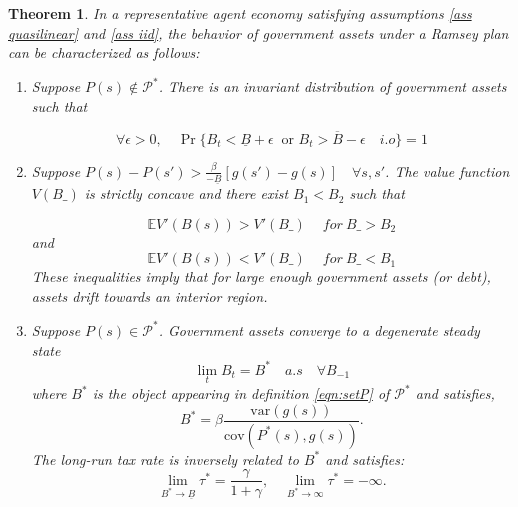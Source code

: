 \documentclass[thmsb,11pt]{article}
\newtheorem{theorem}{Theorem}
\newcommand{\var}{\mathrm{var}}
\newcommand{\cov}{\mathrm{cov}}
\begin{document}




\begin{theorem}
\label{thm: rep agent general theorem}
In a representative agent economy satisfying assumptions \ref{ass quasilinear} and \ref{ass iid}, the behavior of  government assets under a Ramsey plan
can be characterized as follows:
\begin{enumerate}
 \item Suppose $P(s) \not \in \mathcal{P}^*$.  There is an invariant distribution of government assets such that

\[\forall \epsilon>0, \quad \Pr\{B_t<\underline{B}+\epsilon  \ \text{ or } B_t>\overline{B}-\epsilon \quad i.o \}=1\]

\item Suppose  $P(s)-P(s')>\frac{\beta}{-\underline{B}}[g(s')-g(s)]\quad \forall s,s'$.
The value function $V(B\_)$ is strictly concave and there exist $B_1<B_2$ such that

\[\mathbb{E}V'(B(s))>V'(B\_) \quad \ for \ B\_>B_2 \]
and
\[\mathbb{E}V'(B(s))<V'(B\_) \quad \ for \  B\_<B_1 \]
These inequalities imply that for large enough government assets (or debt),
assets drift towards an interior region. %
\item Suppose $P(s)\in \mathcal{P}^*$.  Government assets converge to a degenerate steady state
\[\lim_tB_t=  B^*\quad a.s \quad \forall B_{-1} \]
where $B^*$ is the object appearing in definition \eqref{eqn:setP} of $\mathcal{P}^*$ and satisfies,
\begin{equation} \label{ss-debt} B^*=\beta \frac{\var(g(s))}{\cov(P^*(s),g(s))}. \end{equation}
The long-run tax rate is inversely related to $B^*$ and satisfies:
\[\lim_{B^*\to\underline{B}}\tau^*=\frac{\gamma}{1+\gamma}, \quad \lim_{B^*\to\infty}\tau^*=-\infty .\]

\end{enumerate}


\end{theorem}
\end{document}
